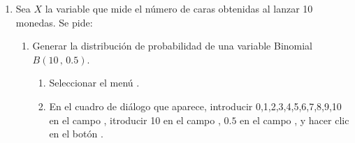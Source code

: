 \begin{enumerate}[leftmargin=*]
\item Sea $X$ la variable que mide el número de caras obtenidas al lanzar 10 monedas. 
Se pide:
\begin{enumerate}

\item Generar la distribución de probabilidad de una variable Binomial $B(10\,,\,0.5)$. 
\begin{indicacion}{
\begin{enumerate}
\item Seleccionar el menú .
\item En el cuadro de diálogo que aparece, introducir 0,1,2,3,4,5,6,7,8,9,10 en el campo ,
itroducir 10 en el campo , $0.5$ en el campo , y hacer clic
en el botón .
\end{enumerate}}
\end{indicacion}


\end{enumerate}
\end{enumerate}
